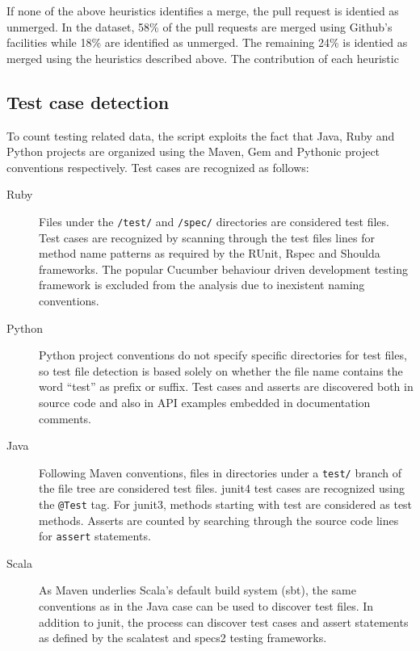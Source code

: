 \documentclass{sig-alternate}
\begin{document}
If none of the above heuristics identifies a merge, the pull request is
identied as unmerged. In the dataset, 58\% of the pull requests are 
merged using Github's facilities while 18\% are identified as unmerged.
The remaining 24\% is identied as merged using the heuristics described
above. The contribution of each heuristic 

\subsection{Test case detection}

To count testing related data, the script exploits the fact that Java, Ruby and Python projects are organized using the Maven, Gem and Pythonic project conventions respectively. Test cases are recognized as follows:

\begin{description}

  \item[Ruby] Files under the \texttt{/test/} and \texttt{/spec/} directories
    are considered test files. Test cases are recognized by scanning through the
    test files lines for method name patterns as required by the \textsf{RUnit},
    \textsf{Rspec} and \textsf{Shoulda} frameworks. The popular Cucumber
    behaviour driven development testing framework is excluded from the analysis
    due to inexistent naming conventions.

  \item[Python] Python project conventions do not specify specific directories
    for test files, so test file detection is based solely on whether the
    file name contains the word ``test'' as prefix or suffix. Test cases
    and asserts are discovered both in source code and also in API examples
    embedded in documentation comments.

  \item[Java] Following Maven conventions, files in directories under a
    \texttt{test/} branch of the file tree are considered test files.
    \textsf{junit4} test cases are recognized using the \texttt{@Test} tag. For
    \textsf{junit3}, methods starting with test are considered as test methods.
    Asserts are counted by searching through the source code lines for
    \texttt{assert} statements.

  \item[Scala] As Maven underlies Scala's default build system (\textsf{sbt}),
    the same conventions as in the Java case can be used to discover test files.
    In addition to \textsf{junit}, the process can discover test cases and
    assert statements as defined by the \textsf{scalatest} and
    \textsf{specs2} testing frameworks.

\end{description}
\end{document}
